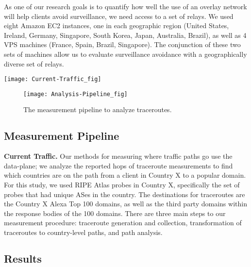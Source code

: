 As one of our research goals is to quantify how well the use of an overlay network will help clients avoid surveillance, we need access to a set of relays.  We used eight Amazon EC2 instances, one in each geographic region (United States, Ireland, Germany, Singapore, South Korea, Japan, Australia, Brazil), as well as 4 VPS machines (France, Spain, Brazil, Singapore).  The conjunction of these two sets of machines allow us to evaluate surveillance avoidance with a geographically diverse set of relays.

\begin{figure*}
\centering
\texttt{[image: Current-Traffic\_fig]}
\caption{The measurement pipeline to study current traffic routes.}
\label{fig:pipeline1}
\end{figure*}

\begin{figure}
\centering
\texttt{[image: Analysis-Pipeline\_fig]}
\caption{The measurement pipeline to analyze traceroutes.}
\label{fig:analysis_pipeline}
\end{figure}

\subsection{Measurement Pipeline}
\label{pipeline}
{\bf Current Traffic.} Our methods for measuring where traffic paths go use the data-plane; we analyze the reported hops of traceroute measurements to find which countries are on the path from a client in Country X to a popular domain.  For this study, we used RIPE Atlas probes in Country X, specifically the set of probes that had unique ASes in the country.  The destinations for traceroutes are the Country X Alexa Top 100 domains, as well as the third party domains within the response bodies of the 100 domains.  There are three main steps to our measurement procedure: traceroute generation and collection, transformation of traceroutes to country-level paths, and path analysis.

\subsection{Results}

